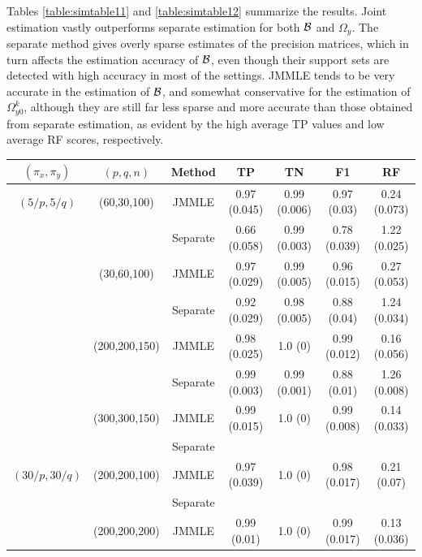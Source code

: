 Tables \ref{table:simtable11} and \ref{table:simtable12} summarize the results. Joint estimation vastly outperforms separate estimation for both ${\cal{B}}$ and $\Omega_y$. The separate method gives overly sparse estimates of the precision matrices, which in turn affects the estimation accuracy of ${\cal{B}}$, even though their support sets are detected with high accuracy in most of the settings. JMMLE tends to be very accurate in the estimation of ${\cal{B}}$, and somewhat conservative for the estimation of $\Omega_{y0}^k$, although they are still far less sparse and more accurate than those obtained from separate estimation, as evident by the high average TP values and low average RF scores, respectively.
%

\begin{scriptsize}
\begin{table}
    \begin{tabular}{ccccccc}
    \hline
    $(\pi_x, \pi_y)$ & $(p,q,n)$   & Method   & TP            & TN             & F1 & RF            \\ \hline
    $(5/p, 5/q)$   & (60,30,100)   & JMMLE    & 0.97 (0.045) & 0.99 (0.006)  & 0.97 (0.03)  & 0.24 (0.073) \\
    ~              & ~             & Separate & 0.66 (0.058) & 0.99 (0.003)  & 0.78 (0.039) & 1.22 (0.025) \\
    ~              & (30,60,100)   & JMMLE    & 0.97 (0.029) & 0.99 (0.005)  & 0.96 (0.015) & 0.27 (0.053) \\
    ~              & ~             & Separate & 0.92 (0.029) & 0.98 (0.005)  & 0.88 (0.04)  & 1.24 (0.034) \\
    ~              & (200,200,150) & JMMLE    & 0.98 (0.025) & 1.0 (0)       & 0.99 (0.012) & 0.16 (0.056) \\
    ~              & ~             & Separate & 0.99 (0.003) & 0.99 (0.001)  & 0.88 (0.01)  & 1.26 (0.008) \\
    ~              & (300,300,150) & JMMLE    & 0.99 (0.015) & 1.0 (0)      & 0.99 (0.008)   & 0.14 (0.033)\\
    ~              & ~             & Separate & ~             & ~              & ~   & ~             \\\hline
    $(30/p, 30/q)$ & (200,200,100) & JMMLE    & 0.97 (0.039) & 1.0 (0)      & 0.98 (0.017)   & 0.21 (0.07) \\
    ~              & ~             & Separate & ~             & ~              & ~   & ~             \\
    ~              & (200,200,200) & JMMLE    & 0.99 (0.01)  & 1.0 (0)      & 0.99 (0.017)   & 0.13 (0.036) \\

\end{tabular}
\end{table}
\end{scriptsize}
